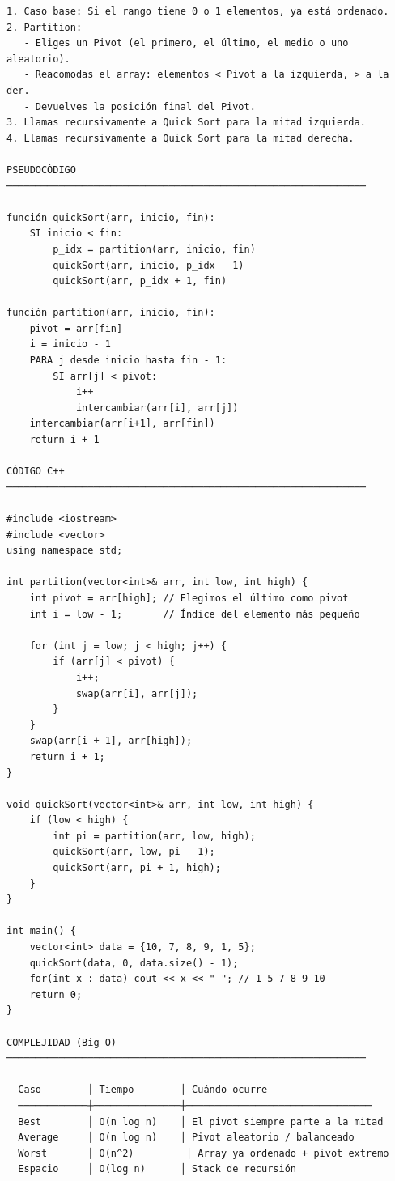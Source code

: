 \begin{lstlisting}
1. Caso base: Si el rango tiene 0 o 1 elementos, ya está ordenado.
2. Partition:
   - Eliges un Pivot (el primero, el último, el medio o uno aleatorio).
   - Reacomodas el array: elementos < Pivot a la izquierda, > a la der.
   - Devuelves la posición final del Pivot.
3. Llamas recursivamente a Quick Sort para la mitad izquierda.
4. Llamas recursivamente a Quick Sort para la mitad derecha.

PSEUDOCÓDIGO
──────────────────────────────────────────────────────────────

función quickSort(arr, inicio, fin):
    SI inicio < fin:
        p_idx = partition(arr, inicio, fin)
        quickSort(arr, inicio, p_idx - 1)
        quickSort(arr, p_idx + 1, fin)

función partition(arr, inicio, fin):
    pivot = arr[fin]
    i = inicio - 1
    PARA j desde inicio hasta fin - 1:
        SI arr[j] < pivot:
            i++
            intercambiar(arr[i], arr[j])
    intercambiar(arr[i+1], arr[fin])
    return i + 1

CÓDIGO C++
──────────────────────────────────────────────────────────────

#include <iostream>
#include <vector>
using namespace std;

int partition(vector<int>& arr, int low, int high) {
    int pivot = arr[high]; // Elegimos el último como pivot
    int i = low - 1;       // Índice del elemento más pequeño

    for (int j = low; j < high; j++) {
        if (arr[j] < pivot) {
            i++;
            swap(arr[i], arr[j]);
        }
    }
    swap(arr[i + 1], arr[high]);
    return i + 1;
}

void quickSort(vector<int>& arr, int low, int high) {
    if (low < high) {
        int pi = partition(arr, low, high);
        quickSort(arr, low, pi - 1);
        quickSort(arr, pi + 1, high);
    }
}

int main() {
    vector<int> data = {10, 7, 8, 9, 1, 5};
    quickSort(data, 0, data.size() - 1);
    for(int x : data) cout << x << " "; // 1 5 7 8 9 10
    return 0;
}

COMPLEJIDAD (Big-O)
──────────────────────────────────────────────────────────────

  Caso        │ Tiempo        │ Cuándo ocurre
  ────────────┼───────────────┼────────────────────────────────
  Best        │ O(n log n)    │ El pivot siempre parte a la mitad
  Average     │ O(n log n)    │ Pivot aleatorio / balanceado
  Worst       │ O(n^2)         │ Array ya ordenado + pivot extremo
  Espacio     │ O(log n)      │ Stack de recursión
\end{lstlisting}

